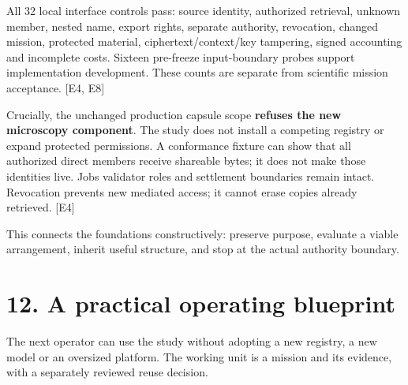 \documentclass[10pt,a4paper]{article}
\begin{document}
All 32 local interface controls pass: source identity, authorized
retrieval, unknown member, nested name, export rights, separate
authority, revocation, changed mission, protected material,
ciphertext/context/key tampering, signed accounting and incomplete
costs. Sixteen pre-freeze input-boundary probes support implementation
development. These counts are separate from scientific mission
acceptance. {[}E4, E8{]}

Crucially, the unchanged production capsule scope \textbf{refuses the
new microscopy component}. The study does not install a competing
registry or expand protected permissions. A conformance fixture can show
that all authorized direct  members receive
shareable bytes; it does not make those identities live. Jobs validator
roles and settlement boundaries remain intact. Revocation prevents new
mediated access; it cannot erase copies already retrieved. {[}E4{]}

This connects the foundations constructively: preserve purpose, evaluate
a viable arrangement, inherit useful structure, and stop at the actual
authority boundary.

\clearpage

\hypertarget{a-practical-operating-blueprint}{%
\section{12. A practical operating
blueprint}\label{a-practical-operating-blueprint}}

The next operator can use the study without adopting a new registry, a
new model or an oversized platform. The working unit is a mission and
its evidence, with a separately reviewed reuse decision.
\end{document}
